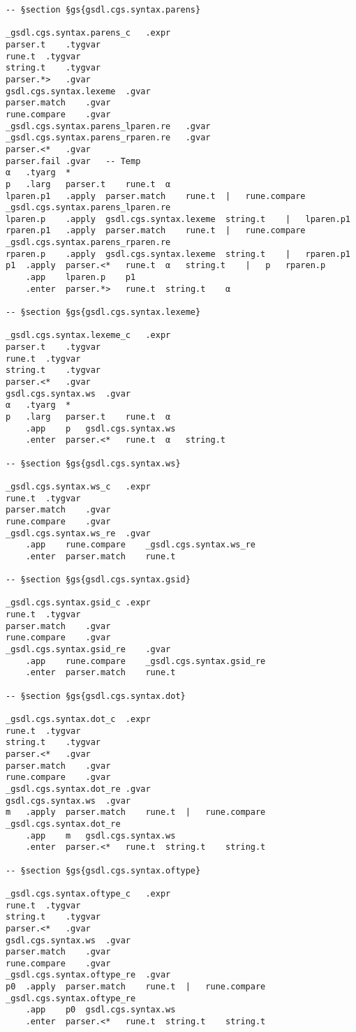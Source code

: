 \documentclass{report}
\begin{document}
\begin{verbatim}
-- §section §gs{gsdl.cgs.syntax.parens}

_gsdl.cgs.syntax.parens_c	.expr
parser.t	.tygvar
rune.t	.tygvar
string.t	.tygvar
parser.*>	.gvar
gsdl.cgs.syntax.lexeme	.gvar
parser.match	.gvar
rune.compare	.gvar
_gsdl.cgs.syntax.parens_lparen.re	.gvar
_gsdl.cgs.syntax.parens_rparen.re	.gvar
parser.<*	.gvar
parser.fail	.gvar	-- Temp
α	.tyarg	*
p	.larg	parser.t	rune.t	α
lparen.p1	.apply	parser.match	rune.t	|	rune.compare	_gsdl.cgs.syntax.parens_lparen.re
lparen.p	.apply	gsdl.cgs.syntax.lexeme	string.t	|	lparen.p1
rparen.p1	.apply	parser.match	rune.t	|	rune.compare	_gsdl.cgs.syntax.parens_rparen.re
rparen.p	.apply	gsdl.cgs.syntax.lexeme	string.t	|	rparen.p1
p1	.apply	parser.<*	rune.t	α	string.t	|	p	rparen.p
	.app	lparen.p	p1
	.enter	parser.*>	rune.t	string.t	α

-- §section §gs{gsdl.cgs.syntax.lexeme}

_gsdl.cgs.syntax.lexeme_c	.expr
parser.t	.tygvar
rune.t	.tygvar
string.t	.tygvar
parser.<*	.gvar
gsdl.cgs.syntax.ws	.gvar
α	.tyarg	*
p	.larg	parser.t	rune.t	α
	.app	p	gsdl.cgs.syntax.ws
	.enter	parser.<*	rune.t	α	string.t

-- §section §gs{gsdl.cgs.syntax.ws}

_gsdl.cgs.syntax.ws_c	.expr
rune.t	.tygvar
parser.match	.gvar
rune.compare	.gvar
_gsdl.cgs.syntax.ws_re	.gvar
	.app	rune.compare	_gsdl.cgs.syntax.ws_re
	.enter	parser.match	rune.t

-- §section §gs{gsdl.cgs.syntax.gsid}

_gsdl.cgs.syntax.gsid_c	.expr
rune.t	.tygvar
parser.match	.gvar
rune.compare	.gvar
_gsdl.cgs.syntax.gsid_re	.gvar
	.app	rune.compare	_gsdl.cgs.syntax.gsid_re
	.enter	parser.match	rune.t

-- §section §gs{gsdl.cgs.syntax.dot}

_gsdl.cgs.syntax.dot_c	.expr
rune.t	.tygvar
string.t	.tygvar
parser.<*	.gvar
parser.match	.gvar
rune.compare	.gvar
_gsdl.cgs.syntax.dot_re	.gvar
gsdl.cgs.syntax.ws	.gvar
m	.apply	parser.match	rune.t	|	rune.compare	_gsdl.cgs.syntax.dot_re
	.app	m	gsdl.cgs.syntax.ws
	.enter	parser.<*	rune.t	string.t	string.t

-- §section §gs{gsdl.cgs.syntax.oftype}

_gsdl.cgs.syntax.oftype_c	.expr
rune.t	.tygvar
string.t	.tygvar
parser.<*	.gvar
gsdl.cgs.syntax.ws	.gvar
parser.match	.gvar
rune.compare	.gvar
_gsdl.cgs.syntax.oftype_re	.gvar
p0	.apply	parser.match	rune.t	|	rune.compare	_gsdl.cgs.syntax.oftype_re
	.app	p0	gsdl.cgs.syntax.ws
	.enter	parser.<*	rune.t	string.t	string.t


\end{verbatim}
\end{document}
